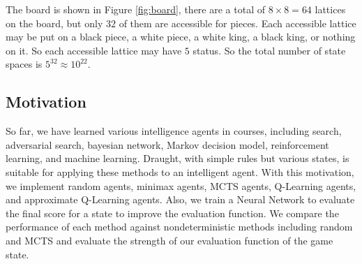 The board is shown in Figure \ref{fig:board}, there are a total of $8\times 8=64$ lattices on the board, but only $32$ of them are accessible for pieces. Each accessible lattice may be put on a black piece, a white piece, a white king, a black king, or nothing on it. So each accessible lattice may have $5$ status. So the total number of state spaces is $5^{32}\approx10^{22}$.

\subsection{Motivation}
So far, we have learned various intelligence agents in courses, including search, adversarial search, bayesian network, Markov decision model, reinforcement learning, and machine learning. Draught, with simple rules but various states, is suitable for applying these methods to an intelligent agent. With this motivation, we implement random agents, minimax agents, MCTS agents, Q-Learning agents, and approximate Q-Learning agents. Also, we train a Neural Network to evaluate the final score for a state to improve the evaluation function. We compare the performance of each method against nondeterministic methods including random and MCTS and evaluate the strength of our evaluation function of the game state. 

